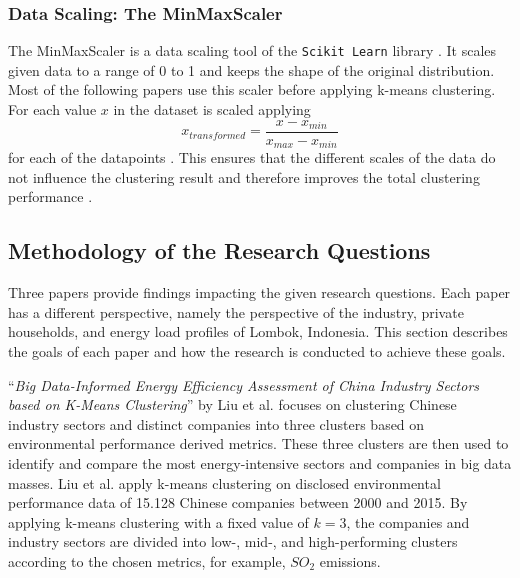\subsubsection{Data Scaling: The MinMaxScaler}
The MinMaxScaler is a data scaling tool of the \texttt{Scikit Learn} library \cite{SKL-MMS}.
It scales given data to a range of 0 to 1 and keeps the shape of the original distribution.
Most of the following papers use this scaler before applying k-means clustering.
For each value $x$ in the dataset is scaled applying \begin{equation}\label{eq:minmaxscaler} 
      x_{transformed} = \frac{x - x_{min}}{x_{max} - x_{min}}
\end{equation} for each of the datapoints \cite{JOJ-ENP}.
This ensures that the different scales of the data do not influence the clustering result and therefore improves the total clustering performance \cite{GOG-WSI}.

\subsection{Methodology of the Research Questions}
\label{sec:methodology_of_the_research_questions}
Three papers provide findings impacting the given research questions.
Each paper has a different perspective, namely the perspective of the industry, private households, and energy load profiles of Lombok, Indonesia.
This section describes the goals of each paper and how the research is conducted to achieve these goals.

\enquote{\textit{Big Data-Informed Energy Efficiency Assessment of China Industry Sectors based on K-Means Clustering}} by Liu et al. \cite{LIU-BDE} focuses on clustering Chinese industry sectors and distinct companies into three clusters based on environmental performance derived metrics.
These three clusters are then used to identify and compare the most energy-intensive sectors and companies in big data masses.
Liu et al. apply k-means clustering on disclosed environmental performance data of 15.128 Chinese companies between 2000 and 2015.
By applying k-means clustering with a fixed value of $k=3$, the companies and industry sectors are divided into low-, mid-, and high-performing clusters according to the chosen metrics, for example, $SO_2$ emissions.

